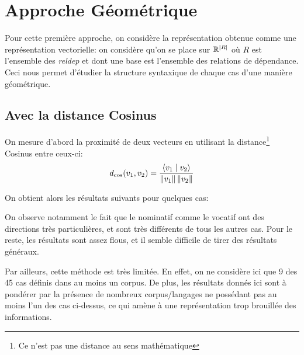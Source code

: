 \documentclass{cours}
\begin{document}
\section{Approche Géométrique}\label{sec:géométrie}
Pour cette première approche, on considère la représentation obtenue comme une représentation vectorielle: on considère qu'on se place sur $\mathbb{R}^{\left|R\right|}$ où $R$ est l'ensemble des \textit{reldep} et dont une base est l'ensemble des relations de dépendance.
Ceci nous permet d'étudier la structure syntaxique de chaque cas d'une manière géométrique.

\subsection{Avec la distance Cosinus}\label{subsec:cosinus}
On mesure d'abord la proximité de deux vecteurs en utilisant la distance\footnote{Ce n'est pas une distance au sens mathématique} Cosinus entre ceux-ci:
\begin{equation}
	d_{\cos}(v_{1},v_{2}) = \frac{\left\langle v_{1}\mid v_{2} \right\rangle}{\left\lVert v_{1} \right\rVert\left\lVert v_{2} \right\rVert}
\end{equation}

On obtient alors les résultats suivants pour quelques cas:







On observe notamment le fait que le nominatif comme le vocatif ont des directions très particulières, et sont très différents de tous les autres cas. Pour le reste, les résultats sont assez flous, et il semble difficile de tirer des résultats généraux.

\medskip
Par ailleurs, cette méthode est très limitée. En effet, on ne considère ici que 9 des 45 cas définis dans au moins un corpus.
De plus, les résultats donnés ici sont à pondérer par la présence de nombreux corpus/langages ne possédant pas au moins l'un des cas ci-dessus, ce qui amène à une représentation trop brouillée des informations.
\end{document}
